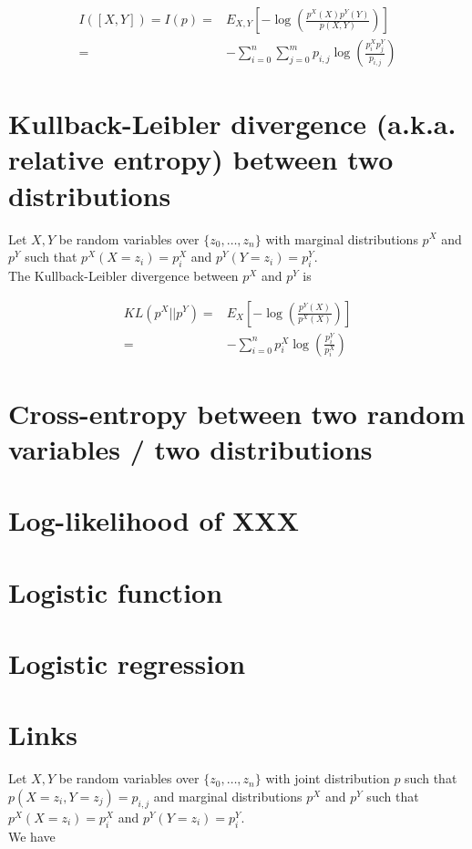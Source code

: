 \documentclass{article}
\begin{document}
\begin{eqnarray*}
    I([X,Y]) = I(p) =& E_{X,Y}[-\log(\frac{p^X(X)p^Y(Y)}{p(X,Y)})] \\
                    =& - \sum_{i=0}^n \sum_{j=0}^m p_{i,j} \log(\frac{p^X_i p^Y_j}{p_{i,j}})
\end{eqnarray*}



\section{Kullback-Leibler divergence (a.k.a. relative entropy) between two distributions}

Let $X,Y$ be  random variables over $\{z_0, \dots, z_n\}$  with  marginal distributions $p^X$ and $p^Y$ such that $p^X(X = z_i) = p^X_i$ and $p^Y(Y = z_i) = p^Y_i$.\\
The Kullback-Leibler divergence between $p^X$ and $p^Y$ is

\begin{eqnarray*}
    KL(p^X||p^Y) =& E_{X}[-\log(\frac{p^Y(X)}{p^X(X)})] \\
                    =& - \sum_{i=0}^n  p^X_{i} \log(\frac{p^Y_i}{p^X_i})
\end{eqnarray*}


\section{Cross-entropy between two random variables / two distributions}

\section{Log-likelihood of XXX}

\section{Logistic function}

\section{Logistic regression}


\section{Links}

Let $X,Y$ be  random variables over $\{z_0, \dots, z_n\}$  with joint distribution $p$ such that $p(X=z_i,Y=z_j)=p_{i,j}$ and marginal distributions $p^X$ and $p^Y$ such that $p^X(X = z_i) = p^X_i$ and $p^Y(Y = z_i) = p^Y_i$.\\
We have
\end{document}
